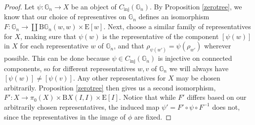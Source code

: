 \documentclass{amsart} %
\begin{document}
\begin{proof}
Let $\psi: \mathbb{G}_n \to X$ be an object of $C_{\mathrm{inj}}(\mathbb{G}_n)$. By Proposition \ref{zerotree}, we know that our choice of representives on $\mathbb{G}_n$ defines an isomorphism $F: \mathbb{G}_n \to \coprod \mathrm{B}\mathbb{G}_n(w, w) \times \mathrm{E}[w]$. Next, choose a similar family of representatives for $X$, making sure that $\psi(w)$ is the representative of the component $[\psi(w)]$ in $X$ for each representative $w$ of $\mathbb{G}_n$, and that $\rho_{\psi(w')} = \psi(\rho_{w'})$ wherever possible. This can be done because $\psi \in C_{\mathrm{inj}}(\mathbb{G}_n)$ is injective on connected components, so for different representatives $w, v$ of $\mathbb{G}_n$ we will always have $[\psi(w)] \neq [\psi(v)]$. Any other representatives for $X$ may be chosen arbitrarily. Proposition \ref{zerotree} then gives us a second isomorphism, $F': X \to \pi_0(X) \times \mathrm{B}X(I,I) \times \mathrm{E}[I]$. Notice that while $F'$ differs based on our arbitrarily chosen representatives, the induced map $\psi' = F' \circ \psi \circ F^{-1}$ does not, since the representatives in the image of $\phi$ are fixed.


\end{proof}
\end{document}
